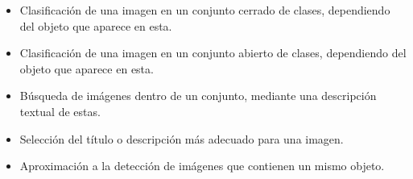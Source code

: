 	\begin{itemize}
		\item Clasificación de una imagen en un conjunto cerrado de clases, dependiendo del objeto que aparece en esta. 
		\item Clasificación de una imagen en un conjunto abierto de clases, dependiendo del objeto que aparece en esta. 
		\item Búsqueda de imágenes dentro de un conjunto, mediante una descripción textual de estas. 
		\item Selección del título o descripción más adecuado para una imagen. 
		\item Aproximación a la detección de imágenes que contienen un mismo objeto. 
	\end{itemize}